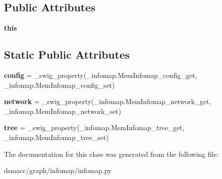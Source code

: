 \subsection*{Public Attributes}
\begin{DoxyCompactItemize}
\item 
\mbox{\label{classdsmacc_1_1graph_1_1infomap_1_1infomap_1_1MemInfomap_a872608eb90ca1f10c4d22d4c696f7b43}} 
{\bfseries this}
\end{DoxyCompactItemize}
\subsection*{Static Public Attributes}
\begin{DoxyCompactItemize}
\item 
\mbox{\label{classdsmacc_1_1graph_1_1infomap_1_1infomap_1_1MemInfomap_a2beb04a79d6288d87a6cbad63fe4d9a3}} 
{\bfseries config} = \+\_\+swig\+\_\+property(\+\_\+infomap.\+Mem\+Infomap\+\_\+config\+\_\+get, \+\_\+infomap.\+Mem\+Infomap\+\_\+config\+\_\+set)
\item 
\mbox{\label{classdsmacc_1_1graph_1_1infomap_1_1infomap_1_1MemInfomap_aea77af1bfb9253cfb9330f630f7e6ff6}} 
{\bfseries network} = \+\_\+swig\+\_\+property(\+\_\+infomap.\+Mem\+Infomap\+\_\+network\+\_\+get, \+\_\+infomap.\+Mem\+Infomap\+\_\+network\+\_\+set)
\item 
\mbox{\label{classdsmacc_1_1graph_1_1infomap_1_1infomap_1_1MemInfomap_a349e9c68cad91312386f5716ac0448cd}} 
{\bfseries tree} = \+\_\+swig\+\_\+property(\+\_\+infomap.\+Mem\+Infomap\+\_\+tree\+\_\+get, \+\_\+infomap.\+Mem\+Infomap\+\_\+tree\+\_\+set)
\end{DoxyCompactItemize}


The documentation for this class was generated from the following file\+:\begin{DoxyCompactItemize}
\item 
dsmacc/graph/infomap/infomap.\+py\end{DoxyCompactItemize}
